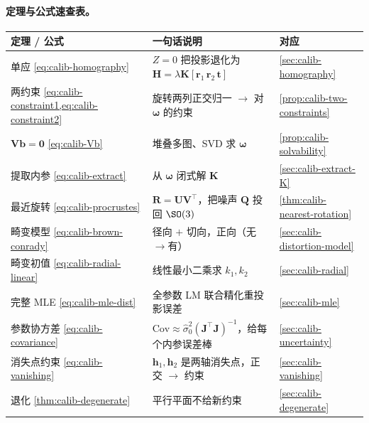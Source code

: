 \paragraph{定理与公式速查表。}
\begin{table}[ht]\centering\small
\begin{tabular}{lll}
\toprule
定理 / 公式 & 一句话说明 & 对应 \\
\midrule
单应 \cref{eq:calib-homography} & $Z=0$ 把投影退化为 $\mathbf{H}=\lambda\mathbf{K}[\mathbf{r}_1\,\mathbf{r}_2\,\mathbf{t}]$ & \cref{sec:calib-homography} \\
两约束 \cref{eq:calib-constraint1,eq:calib-constraint2} & 旋转两列正交归一 $\to$ 对 $\boldsymbol{\omega}$ 的约束 & \cref{prop:calib-two-constraints} \\
$\mathbf{V}\mathbf{b}=\mathbf{0}$ \cref{eq:calib-Vb} & 堆叠多图、SVD 求 $\boldsymbol{\omega}$ & \cref{prop:calib-solvability} \\
提取内参 \cref{eq:calib-extract} & 从 $\boldsymbol{\omega}$ 闭式解 $\mathbf{K}$ & \cref{sec:calib-extract-K} \\
最近旋转 \cref{eq:calib-procrustes} & $\mathbf{R}=\mathbf{U}\mathbf{V}^\top$，把噪声 $\mathbf{Q}$ 投回 $\SO(3)$ & \cref{thm:calib-nearest-rotation} \\
畸变模型 \cref{eq:calib-brown-conrady} & 径向 $+$ 切向，正向（无$\to$有）& \cref{sec:calib-distortion-model} \\
畸变初值 \cref{eq:calib-radial-linear} & 线性最小二乘求 $k_1,k_2$ & \cref{sec:calib-radial} \\
完整 MLE \cref{eq:calib-mle-dist} & 全参数 LM 联合精化重投影误差 & \cref{sec:calib-mle} \\
参数协方差 \cref{eq:calib-covariance} & $\mathrm{Cov}\approx\hat\sigma_0^2(\mathbf{J}^\top\mathbf{J})^{-1}$，给每个内参误差棒 & \cref{sec:calib-uncertainty} \\
消失点约束 \cref{eq:calib-vanishing} & $\mathbf{h}_1,\mathbf{h}_2$ 是两轴消失点，正交 $\to$ 约束 & \cref{sec:calib-vanishing} \\
退化 \cref{thm:calib-degenerate} & 平行平面不给新约束 & \cref{sec:calib-degenerate} \\
\bottomrule
\end{tabular}
\end{table}


